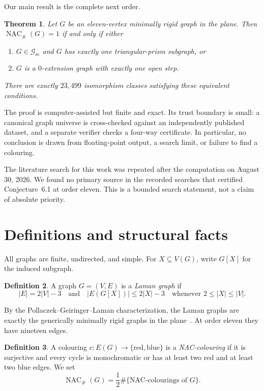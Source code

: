 \documentclass[11pt]{amsart}
\newtheorem{theorem}{Theorem}[section]
\theoremstyle{definition}
\newtheorem{definition}[theorem]{Definition}
\newcommand{\NACnum}{\operatorname{NAC}_{\#}}
\newcommand{\Gsc}{\mathcal G_{\mathrm{sc}}}
\begin{document}
Our main result is the complete next order.

\begin{theorem}\label{thm:main}
Let $G$ be an eleven-vertex minimally rigid graph in the plane.  Then
$\NACnum(G)=1$ if and only if either
\begin{enumerate}
\item $G\in\Gsc$ and $G$ has exactly one triangular-prism subgraph, or
\item $G$ is a $0$-extension graph with exactly one open step.
\end{enumerate}
There are exactly $23{,}499$ isomorphism classes satisfying these equivalent
conditions.
\end{theorem}

The proof is computer-assisted but finite and exact.  Its trust boundary is
small: a canonical graph universe is cross-checked against an independently
published dataset, and a separate verifier checks a four-way certificate.  In
particular, no conclusion is drawn from floating-point output, a search limit,
or failure to find a colouring.

The literature search for this work was repeated after the computation on
August 30, 2026.  We found no primary source in the recorded searches that
certified Conjecture~6.1 at order eleven.  This is a bounded search statement,
not a claim of absolute priority.

\section{Definitions and structural facts}

All graphs are finite, undirected, and simple.  For $X\subseteq V(G)$, write
$G[X]$ for the induced subgraph.

\begin{definition}
A graph $G=(V,E)$ is a \emph{Laman graph} if
\[
 |E|=2|V|-3
 \quad\text{and}\quad
 |E(G[X])|\leq 2|X|-3
 \quad\text{whenever }2\leq |X|\leq |V|.
\]
\end{definition}

By the Pollaczek--Geiringer--Laman characterization, the Laman graphs are
exactly the generically minimally rigid graphs in the plane~\cite{laman1970}.
At order eleven they have nineteen edges.

\begin{definition}
A colouring $c:E(G)\to\{\mathrm{red},\mathrm{blue}\}$ is a
\emph{NAC-colouring} if it is surjective and every cycle is monochromatic or
has at least two red and at least two blue edges.  We set
\[
 \NACnum(G)=\frac12\#\{\text{NAC-colourings of }G\}.
\]
\end{definition}
\end{document}
